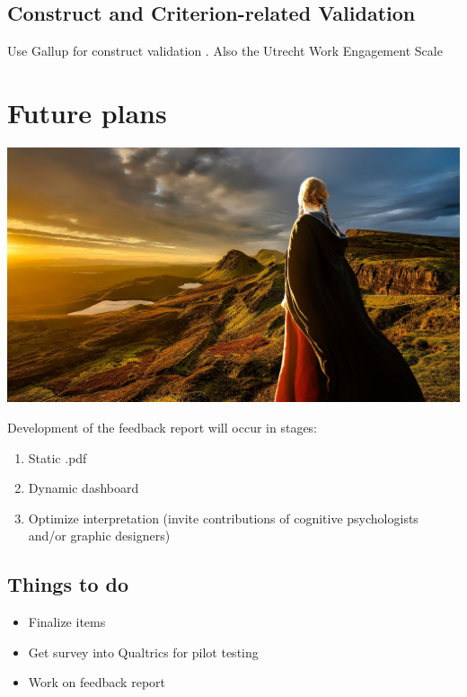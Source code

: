\documentclass[
]{book}
\providecommand{\tightlist}{%
  \setlength{\itemsep}{0pt}\setlength{\parskip}{0pt}}
\begin{document}
\hypertarget{construct-and-criterion-related-validation}{%
\section{Construct and Criterion-related Validation}\label{construct-and-criterion-related-validation}}

Use Gallup for construct validation \citep{thackray_gallup_2005}. Also the Utrecht Work Engagement Scale \citep[UWES;][]{schaufeli_measurement_2002, schaufeli_defining_2010}

\hypertarget{future-plans}{%
\chapter{Future plans}\label{future-plans}}

\includegraphics{future.jpg}

Development of the feedback report will occur in stages:

\begin{enumerate}
\def\labelenumi{\arabic{enumi}.}
\tightlist
\item
  Static .pdf
\item
  Dynamic dashboard
\item
  Optimize interpretation (invite contributions of cognitive psychologists and/or graphic designers)
\end{enumerate}

\hypertarget{things-to-do}{%
\section{Things to do}\label{things-to-do}}

\begin{itemize}
\tightlist
\item
  Finalize items
\item
  Get survey into Qualtrics for pilot testing
\item
  Work on feedback report
\end{itemize}
\end{document}

